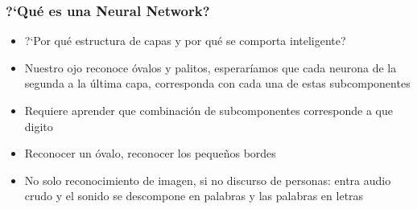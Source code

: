 \documentclass[10pt]{beamer}
\begin{document}
\begin{frame}
\frametitle{?`Qu\'e es una Neural Network?}
\begin{beamerboxesrounded}[upper=uppercolor, lower=lowercolor, shadow=true]{} 

\begin{itemize}
\item ?`Por qu\'e estructura de capas y por qu\'e se comporta inteligente?
\item Nuestro ojo reconoce \'ovalos y palitos, esperar\'iamos que cada neurona de la segunda a la \'ultima capa, corresponda con cada una de estas subcomponentes 
\item Requiere aprender que combinaci\'on de subcomponentes corresponde a que digito
\item Reconocer un \'ovalo, reconocer los peque\~nos bordes
\item No solo reconocimiento de imagen, si no discurso de personas: entra audio crudo y el sonido se descompone en palabras y las palabras en letras 

\end{itemize}
\end{beamerboxesrounded}


\end{frame}
\end{document}
